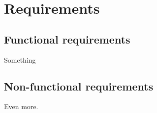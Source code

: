 \chapter{Requirements}
\section{Functional requirements}
Something
\section{Non-functional requirements}
Even more.